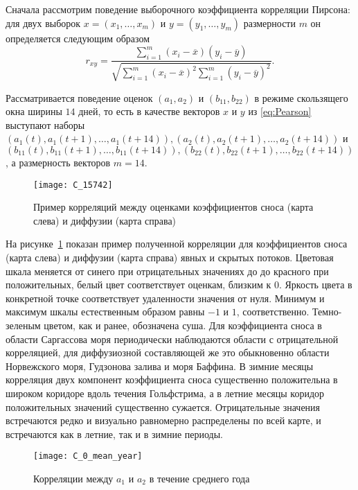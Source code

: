 Сначала рассмотрим поведение выборочного коэффициента корреляции Пирсона: для двух выборок $x = (x_1, \dots, x_m)$ и $y = (y_1, \dots, y_m)$ размерности $m$ он определяется следующим образом
\begin{equation}
	\label{eq:Pearson}
	r_{xy} = \frac{\sum_{i=1}^{m}(x_i - \overline{x})(y_i - \overline{y}) }{\sqrt{\sum_{i=1}^{m}(x_i - \overline{x})^2 \sum_{i=1}^{m}(y_i - \overline{y})^2}}.
\end{equation}

Рассматривается поведение оценок $(a_1, a_2)$ и $(b_{11}, b_{22})$
в режиме скользящего окна ширины $14$ дней, то есть в качестве векторов $x$ и $y$ из \eqref{eq:Pearson} выступают наборы $(a_1(t), a_1(t+1), \dots, a_1(t+14)), (a_2(t), a_2(t+1), \dots, a_2(t+14))$ и $(b_{11}(t), b_{11}(t+1), \dots, b_{11}(t+14)), (b_{22}(t), b_{22}(t+1), \dots, b_{22}(t+14))$, а размерность векторов $m=14$.

\begin{figure}[!h]
	\centering
	\texttt{[image: C\_15742]}
	\caption{Пример корреляций между оценками коэффициентов сноса (карта слева) и диффузии (карта справа)}
	\label{fig:c_example}
\end{figure}

На рисунке~\ref{fig:c_example} показан пример полученной корреляции для коэффициентов сноса (карта слева) и диффузии (карта справа) явных и скрытых потоков. Цветовая шкала меняется от синего при отрицательных значениях до до красного при положительных, белый цвет соответствует оценкам, близким к $0$. Яркость цвета в конкретной точке соответствует удаленности значения от нуля. Минимум и максимум шкалы естественным образом равны $-1$ и $1$, соответственно. Темно-зеленым цветом, как и ранее, обозначена суша. Для коэффициента сноса в области Саргассова моря периодически наблюдаются области с отрицательной корреляцией, для диффузиозной составляющей же это обыкновенно области Норвежского моря, Гудзонова залива и моря Баффина. В зимние месяцы корреляция двух компонент коэффициента сноса существенно положительна в широком коридоре вдоль течения Гольфстрима, а в летние месяцы коридор положительных значений существенно сужается. Отрицательные значения встречаются редко и визуально равномерно распределены по всей карте, и встречаются как в летние, так и в зимние периоды.

\begin{figure}[h!]
	\centering
	\texttt{[image: C\_0\_mean\_year]}
	\caption{Корреляции между $a_1$ и $a_2$ в течение среднего года}
	\label{fig:c0}
\end{figure}

